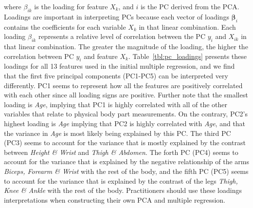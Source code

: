 \documentclass[letterpaper, 12pt]{article}
\begin{document}
	where $\beta_{ik}$ is the loading for feature $X_{k}$, and $i$ is the PC derived from the PCA.  Loadings are important in interpreting PCs because each vector of loadings $\boldsymbol{\beta}_{i}$ contains the coefficients for each variable $X_{k}$ in that linear combination.  Each loading $\beta_{ik}$ represents a relative level of correlation between the PC $y_{i}$ and $X_{ik}$ in that linear combination.  The greater the magnitude of the loading, the higher the correlation between PC $y_{i}$ and feature $X_{k}$.  Table~\ref{tbl:pc_loadings} presents these loadings for all 13 features used in the initial multiple regression, and we find that the first five principal components (PC1-PC5) can be interpreted very differently.  PC1 seems to represent how all the features are positively correlated with each other since all loading signs are positive.  Further note that the smallest loading is \textit{Age}, implying that PC1 is highly correlated with all of the other variables that relate to physical body part measurements.  On the contrary, PC2's highest loading is \textit{Age} implying that PC2 is highly correlated with \textit{Age}, and that the variance in \textit{Age} is most likely being explained by this PC.  The third PC (PC3) seems to account for the variance that is mostly explained by the contrast between \textit{Height \& Wrist} and \textit{Thigh \& Abdomen}.  The forth PC (PC4) seems to account for the variance that is explained by the negative relationship of the arms \textit{Biceps, Forearm \& Wrist} with the rest of the body, and the fifth PC (PC5) seems to account for the variance that is explained by the contrast of the legs \textit{Thigh, Knee \& Ankle} with the rest of the body.  Practitioners should use these loadings interpretations when constructing their own PCA and multiple regression.
\end{document}
